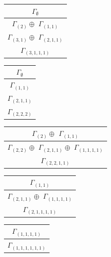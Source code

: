 \documentclass[main.tex]{subfiles}
\begin{document}
\begin{minipage}{.2\textwidth}
\centering
\begin{tabular}{c}
$\Gamma_\emptyset$
\\ \hline
$\Gamma_{(
2
)} \oplus$
$\Gamma_{(
1 , 
1
)}$
\\ \hline
$\Gamma_{(
3 , 
1
)} \oplus$
$\Gamma_{(
2 , 
1 , 
1
)}$
\\ \hline
$\Gamma_{(
3 , 
1 , 
1 , 
1
)}$
\\
\end{tabular}\end{minipage}
\begin{minipage}{.2\textwidth}
\centering
\begin{tabular}{c}
$\Gamma_\emptyset$
\\ \hline
$\Gamma_{(
1 , 
1
)}$
\\ \hline
$\Gamma_{(
2 , 
1 , 
1
)}$
\\ \hline
$\Gamma_{(
2 , 
2 , 
2
)}$
\\
\end{tabular}\end{minipage}
\begin{minipage}{.3\textwidth}
\centering
\begin{tabular}{c}
$\Gamma_{(
2
)} \oplus$
$\Gamma_{(
1 , 
1
)}$
\\ \hline
$\Gamma_{(
2 , 
2
)} \oplus$
$\Gamma_{(
2 , 
1 , 
1
)} \oplus$
$\Gamma_{(
1 , 
1 , 
1 , 
1
)}$
\\ \hline
$\Gamma_{(
2 , 
2 , 
1 , 
1
)}$
\\
\end{tabular}\end{minipage}
\bigskip
\begin{minipage}{.3\textwidth}
\centering
\begin{tabular}{c}
$\Gamma_{(
1 , 
1
)}$
\\ \hline
$\Gamma_{(
2 , 
1 , 
1
)} \oplus$
$\Gamma_{(
1 , 
1 , 
1 , 
1
)}$
\\ \hline
$\Gamma_{(
2 , 
1 , 
1 , 
1 , 
1
)}$
\\
\end{tabular}\end{minipage}
\begin{minipage}{.2\textwidth}
\centering
\begin{tabular}{c}
$\Gamma_{(
1 , 
1 , 
1 , 
1
)}$
\\ \hline
$\Gamma_{(
1 , 
1 , 
1 , 
1 , 
1 , 
1
)}$
\\
\end{tabular}\end{minipage}
\end{document}
